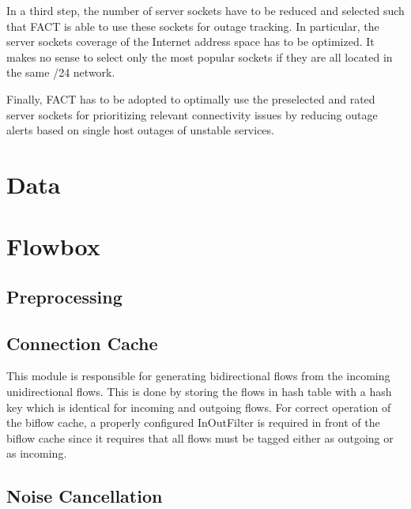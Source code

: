In a third step, the number of server sockets have to be reduced and
selected such that FACT is able to use these sockets
for outage tracking. In particular, the server sockets coverage of the
Internet address space has to be optimized. It makes no sense to select
only the most popular sockets if they are all located in the same /24
network.

Finally, FACT has to be adopted to optimally use the preselected and rated 
server sockets for prioritizing relevant connectivity issues by reducing 
outage alerts based on single host outages of unstable services.

\section{Data\label{section:data}}





\section{Flowbox\label{section:flowbox}}

\subsection{Preprocessing}

\subsection{Connection Cache}
This module is responsible for generating bidirectional flows from the incoming unidirectional flows. This is done by storing the flows in hash table with a hash key which is identical for incoming and outgoing flows. For correct operation of the biflow cache, a properly configured InOutFilter is required in front of the biflow cache since it requires that all flows must be tagged either as outgoing or as incoming. 

\subsection{Noise Cancellation}
